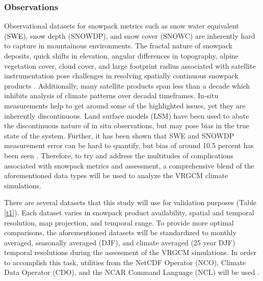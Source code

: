 \documentclass[11pt]{article}
\begin{document}
\subsubsection{Observations}
Observational datasets for snowpack metrics such as snow water equivalent (SWE), snow depth (SNOWDP), and snow cover (SNOWC) are inherently hard to capture in mountainous environments.  The fractal nature of snowpack deposits, quick shifts in elevation, angular differences in topography, alpine vegetation cover, cloud cover, and large footprint radius associated with satellite instrumentation pose challenges in resolving spatially continuous snowpack products \citep{brownandmote2009, rutter2009SnowMIP2}.  Additionally, many satellite products span less than a decade which inhibits analysis of climate patterns over decadal timeframes.  In-situ measurements help to get around some of the highlighted issues, yet they are inherently discontinuous.  Land surface models (LSM) have been used to abate the discontinuous nature of in situ observations, but may pose bias in the true state of the system.  Further, it has been shown that SWE and SNOWDP measurement error can be hard to quantify, but bias of around 10.5 percent has been seen \citep{ rutter2009SnowMIP2}.  Therefore, to try and address the multitudes of complications associated with snowpack metrics and assessment, a comprehensive blend of the aforementioned data types will be used to analyze the VRGCM climate simulations. 

There are several datasets that this study will use for validation purposes (Table \ref{t1}).  Each dataset varies in snowpack product availability, spatial and temporal resolution, map projection, and temporal range.  To provide more optimal comparisons, the aforementioned datasets will be standardized to monthly averaged, seasonally averaged (DJF), and climate averaged (25 year DJF) temporal resolutions during the assessment of the VRGCM simulations.  In order to accomplish this task, utilities from the NetCDF Operator (NCO), Climate Data Operator (CDO), and the NCAR Command Language (NCL) will be used \citep{schulzweida2007cdo,zender2006netcdf}.  
\end{document}
